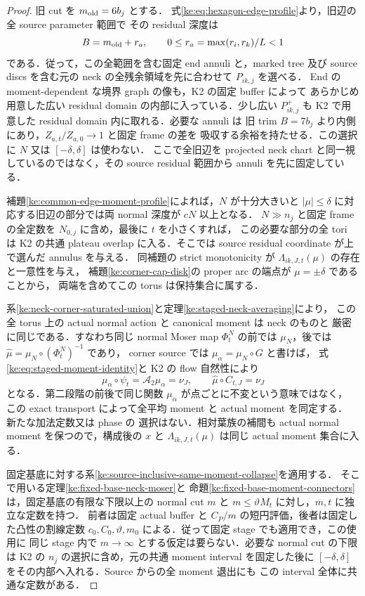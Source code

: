 \begin{proof}
旧 cut を $m_{\rm old}=6b_j$ とする．
式\eqref{ke:eq:hexagon-edge-profile}より，旧辺の全 source parameter 範囲で
その residual 深度は
\[
 B=m_{\rm old}+r_a,\qquad
 0\le r_a=\max(r_i,r_k)/L<1
\]
である．従って，この全範囲を含む固定 end annuli と，marked tree 及び source
discs を含む元の neck の全残余領域を先に合わせて $P_{ik,j}$ を選べる．
End の moment-dependent な境界 graph の像も，K2 の固定 buffer によって
あらかじめ用意した広い residual domain の内部に入っている．少し広い
$P^+_{ik,j}$ も K2 で用意した residual domain 内に取れる．必要な annuli は
旧 trim $B=7b_j$ より内側にあり，$Z_{a,t}/Z_{a,0}\to1$ と固定 frame の差を
吸収する余裕を持たせる．この選択に $N$ 又は $[-\delta,\delta]$ は使わない．
ここで全旧辺を projected neck chart と同一視しているのではなく，その source
residual 範囲から annuli を先に固定している．

補題\ref{ke:common-edge-moment-profile}によれば，$N$ が十分大きいと
$|\mu|\le\delta$ に対応する旧辺の部分では両 normal 深度が $cN$ 以上となる．
$N\gg n_j$ と固定 frame の全定数を $N_{0,j}$ に含め，最後に $t$ を小さくすれば，
この必要な部分の全 tori は K2 の共通 plateau overlap に入る．そこでは
source residual coordinate が上で選んだ annulus を与える．
同補題の strict monotonicity が $\Lambda_{ik,J,t}(\mu)$ の存在と一意性を与え，
補題\ref{ke:corner-cap-disk}の proper arc の端点が $\mu=\pm\delta$ であることから，
両端を含めてこの torus は保持集合に属する．

系\ref{ke:neck-corner-saturated-union}と定理\ref{ke:staged-neck-averaging}により，
この全 torus 上の actual normal action と canonical moment は neck のものと
厳密に同じである．すなわち同じ normal Moser map $\Phi^N_t$ の前では
$\mu_N$，後では $\widehat\mu=\mu_N\circ(\Phi^N_t)^{-1}$ であり，
corner source では $\mu_\alpha=\mu_N\circ G$ と書けば，
式\eqref{ke:eq:staged-moment-identity}と K2 の flow 自然性により
\[
 \mu_\alpha\circ\psi_t=\mathcal A_2\mu_\alpha=\nu_J,
 \qquad \widehat\mu\circ C_{t,J}=\nu_J
\]
となる．第二段階の前後で同じ関数 $\mu_\alpha$ が点ごとに不変という意味ではなく，
この exact transport によって全平均 moment と actual moment を同定する．
新たな加法定数又は phase の
選択はない．相対葉族の補間も actual normal moment を保つので，構成後の $x$ と
$\Lambda_{ik,J,t}(\mu)$ は同じ actual moment 集合に入る．

固定基底に対する系\ref{ke:source-inclusive-same-moment-collapse}を適用する．
そこで用いる定理\ref{ke:fixed-base-neck-moser}と
命題\ref{ke:fixed-base-moment-connectors}は，固定基底の有限な下限以上の
normal cut $m$ と $m\le\vartheta M_t$ に対し，$m,t$ に独立な定数を持つ．
前者は固定 actual buffer と $C_P/m$ の短円評価，後者は固定した凸性の割線定数
$c_0,C_0,\vartheta,m_0$ による．従って固定 stage でも適用でき，この使用に
同じ stage 内で $m\to\infty$ とする仮定は要らない．必要な normal cut の下限は
K2 の $n_j$ の選択に含め，元の共通 moment interval を固定した後に
$[-\delta,\delta]$ をその内部へ入れる．Source からの全 moment 退出にも
この interval 全体に共通な定数がある．


\end{proof}
